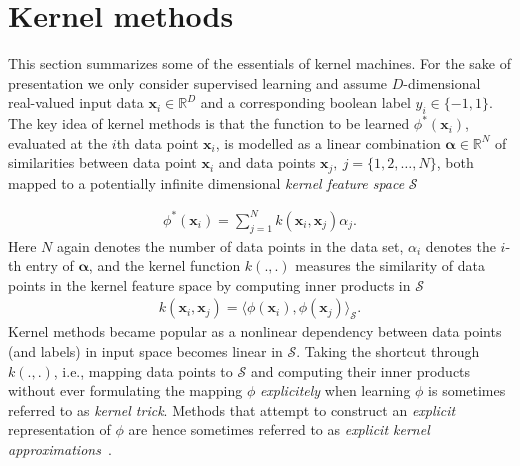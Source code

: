 \documentclass{article} %
\newcommand{\R}{\ensuremath{\mathds{R}}}
\newcommand{\va}{\boldsymbol{\alpha}}
\newcommand{\Bx}{\mathbf{x}}
\renewcommand{\vec}[1]{\mathbf{#1}}
\begin{document}
\section{Kernel methods}\label{sec:kernels}
This section summarizes some of the essentials of kernel machines. For the sake of presentation we only consider supervised learning and assume $D$-dimensional real-valued input data $\Bx_i\in\R^D$ and a corresponding boolean label $y_i\in\{-1,1\}$. The key idea of kernel methods is that the function to be learned $\phi^*(\Bx_i) $, evaluated at the $i$th data point $\Bx_i$, is modelled as a linear combination $\va\in\R^N$ of similarities between data point $\vec{x}_i$ and data points $\vec{x}_j,~j=\{1,2,\dots,N\}$, both mapped to a potentially infinite dimensional {\em kernel feature space} $\mathcal{S}$

\begin{align}\label{eq:kernel_trick}
\phi^*(\Bx_i)=\sum_{j=1}^N k(\Bx_i,\Bx_j)\alpha_j.
\end{align}
Here $N$ again denotes the number of data points in the data set, $\alpha_i$ denotes the $i$-th entry of $\va$, and the kernel function $k(.,.)$ measures the similarity of data points in the kernel feature space by computing inner products in $\mathcal{S}$
\begin{align}\label{eq:kernel_function}
k(\Bx_i,\Bx_j)=\langle \phi(\Bx_i), \phi(\Bx_j)\rangle_{\mathcal{S}}.
\end{align}
%
Kernel methods became popular as a nonlinear dependency between data points (and labels) in input space becomes linear in $\mathcal{S}$.
Taking the shortcut through $k(.,.)$, i.e., mapping data points to $\mathcal{S}$ and computing their inner products without ever formulating the mapping $\phi$ {\em explicitely} when learning $\phi$ is sometimes referred to as {\em kernel trick}. Methods that attempt to construct an {\em explicit} representation of $\phi$ are hence sometimes referred to as {\em explicit kernel approximations}~\cite{Dai2014}. 
\end{document}
